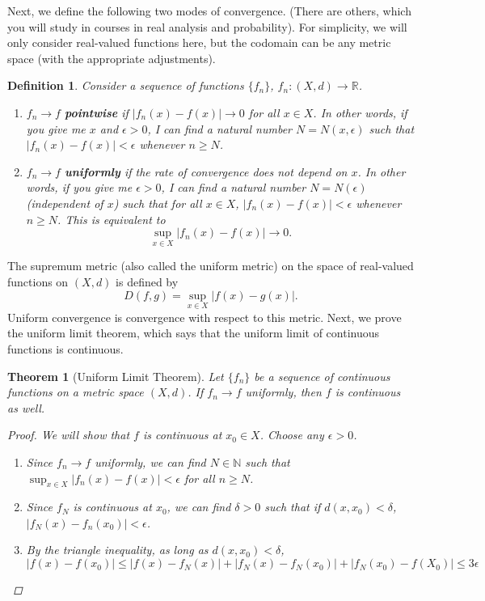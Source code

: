 \documentclass[12pt]{amsart}         %
\newtheorem{definition}{Definition}[section]
\newtheorem{theorem}{Theorem}[section]
\theoremstyle{remark}
\newcommand{\N}{\mathbb{N}}
\newcommand{\R}{\mathbb{R}}
\begin{document}
Next, we define the following two modes of convergence. (There are others, which you will study in courses in real analysis and probability). For simplicity, we will only consider real-valued functions here, but the codomain can be any metric space (with the appropriate adjustments).

\begin{definition}
Consider a sequence of functions $\{f_n\}$, $f_n:(X, d) \rightarrow \R$. 
\begin{enumerate}
    \item $f_n \rightarrow f$ \textbf{pointwise} if $|f_n(x) - f(x)| \rightarrow 0$ for all $x \in X$. In other words, if you give me $x$ and $\epsilon > 0$, I can find a natural number $N = N(x, \epsilon)$ such that $|f_n(x) - f(x)| < \epsilon$ whenever $n \geq N$.
    \item $f_n \rightarrow f$ \textbf{uniformly} if the rate of convergence does not depend on $x$. In other words, if you give me $\epsilon > 0$, I can find a natural number $N = N(\epsilon)$ (independent of $x$) such that for all $x \in X$, $|f_n(x) - f(x)| < \epsilon$ whenever $n \geq N$. This is equivalent to
    \[
    \sup_{x \in X}|f_n(x) - f(x)| \rightarrow 0.
    \]
\end{enumerate}
\end{definition}

The supremum metric (also called the uniform metric) on the space of real-valued functions on $(X, d)$ is defined by
\[
D(f,g) = \sup_{x \in X}|f(x) - g(x)|.
\]
Uniform convergence is convergence with respect to this metric. Next, we prove the uniform limit theorem, which says that the uniform limit of continuous functions is continuous.

\begin{theorem}[Uniform Limit Theorem]
Let $\{f_n\}$ be a sequence of continuous functions on a metric space $(X,d)$.
If $f_n \rightarrow f$ uniformly, then $f$ is continuous as well.
\begin{proof}
We will show that $f$ is continuous at $x_0 \in X$. Choose any $\epsilon > 0$.
\begin{enumerate}
\item Since $f_n \rightarrow f$ uniformly, we can find $N \in \N$ such that $\sup_{x \in X}|f_n(x) - f(x)| < \epsilon$ for all $n \geq N$.
\item Since $f_N$ is continuous at $x_0$, we can find $\delta > 0$ such that if $d(x, x_0) < \delta$, $|f_N(x) - f_n(x_0)| < \epsilon$. 
\item By the triangle inequality, as long as $d(x, x_0) < \delta$,
\[
|f(x) - f(x_0)| \leq |f(x) - f_N(x)| + |f_N(x) - f_N(x_0)| + |f_N(x_0) - f(X_0)| \leq 3 \epsilon
\]
\end{enumerate}
\end{proof}
\end{theorem}
\end{document}
